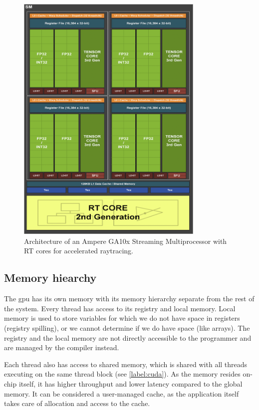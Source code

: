 \begin{figure}[H]
  \centering
  \includegraphics[width=0.8\textwidth ]{components/figure/ampere-sm.png}
  \caption[Architecture of an Ampere GA10x Streaming Multiprocessor]{Architecture of an Ampere GA10x Streaming Multiprocessor with RT cores for accelerated raytracing. \cite{nvidiaampere}}
  \label{figure:ampere-sm}
\end{figure}

\subsection{Memory hiearchy} \label{label:gpu:mem}

The \acrshort{gpu} has its own memory with its memory hierarchy separate from the rest of the system. Every thread has access to its registry and local memory. Local memory is used to store variables for which we do not have space in registers (registry spilling), or we cannot determine if we do have space (like arrays). The registry and the local memory are not directly accessible to the programmer and are managed by the compiler instead.

Each thread also has access to shared memory, which is shared with all threads executing on the same thread block (see \cref{label:cuda}). As the memory resides on-chip itself, it has higher throughput and lower latency compared to the global memory. It can be considered a user-managed cache, as the application itself takes care of allocation and access to the cache.

